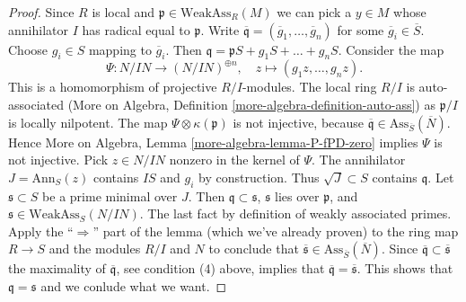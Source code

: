\begin{proof}
\medskip\noindent
Since $R$ is local and $\mathfrak p \in \text{WeakAss}_R(M)$
we can pick a $y \in M$ whose annihilator $I$ has radical
equal to $\mathfrak p$.
Write $\overline{\mathfrak q} = (\overline{g}_1, \ldots, \overline{g}_n)$
for some $\overline{g}_i \in \overline{S}$. Choose $g_i \in S$
mapping to $\overline{g}_i$.
Then $\mathfrak q = \mathfrak pS + g_1S + \ldots + g_nS$.
Consider the map
$$
\Psi : N/IN \longrightarrow (N/IN)^{\oplus n}, \quad
z \longmapsto (g_1z, \ldots, g_nz).
$$
This is a homomorphism of projective $R/I$-modules.
The local ring $R/I$ is auto-associated
(More on Algebra, Definition \ref{more-algebra-definition-auto-ass})
as $\mathfrak p/I$ is locally nilpotent.
The map $\Psi \otimes \kappa(\mathfrak p)$ is not injective, because
$\overline{\mathfrak q} \in \text{Ass}_{\overline{S}}(\overline{N})$.
Hence More on Algebra, Lemma \ref{more-algebra-lemma-P-fPD-zero}
implies $\Psi$ is not injective. Pick $z \in N/IN$
nonzero in the kernel of $\Psi$. The annihilator $J = \text{Ann}_S(z)$
contains $IS$ and $g_i$ by construction. Thus
$\sqrt{J} \subset S$ contains $\mathfrak q$.
Let $\mathfrak s \subset S$ be a prime minimal over $J$.
Then $\mathfrak q \subset \mathfrak s$,
$\mathfrak s$ lies over $\mathfrak p$, and
$\mathfrak s \in \text{WeakAss}_S(N/IN)$.
The last fact by definition of weakly associated primes.
Apply the ``$\Rightarrow$'' part of the lemma (which we've already proven)
to the ring map $R \to S$ and the modules $R/I$ and $N$
to conclude that
$\overline{\mathfrak s} \in \text{Ass}_{\overline{S}}(\overline{N})$.
Since $\overline{\mathfrak q} \subset \overline{\mathfrak s}$
the maximality of $\overline{\mathfrak q}$, see condition (4) above,
implies that $\overline{\mathfrak q} = \overline{\mathfrak s}$.
This shows that $\mathfrak q = \mathfrak s$ and we conlude
what we want.
\end{proof}
